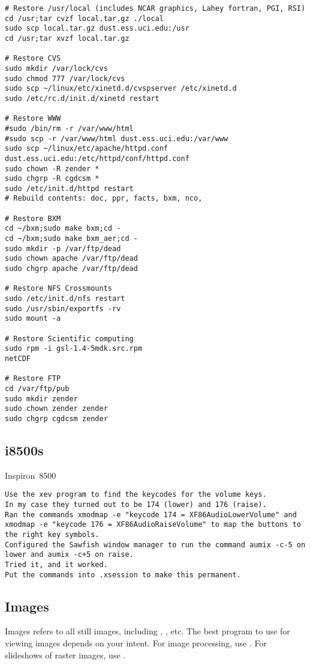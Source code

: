 \documentclass[12pt,twoside]{article}
\begin{document}
\begin{verbatim}
# Restore /usr/local (includes NCAR graphics, Lahey fortran, PGI, RSI)
cd /usr;tar cvzf local.tar.gz ./local
sudo scp local.tar.gz dust.ess.uci.edu:/usr
cd /usr;tar xvzf local.tar.gz

# Restore CVS
sudo mkdir /var/lock/cvs
sudo chmod 777 /var/lock/cvs
sudo scp ~/linux/etc/xinetd.d/cvspserver /etc/xinetd.d
sudo /etc/rc.d/init.d/xinetd restart

# Restore WWW
#sudo /bin/rm -r /var/www/html
#sudo scp -r /var/www/html dust.ess.uci.edu:/var/www
sudo scp ~/linux/etc/apache/httpd.conf dust.ess.uci.edu:/etc/httpd/conf/httpd.conf
sudo chown -R zender *
sudo chgrp -R cgdcsm *
sudo /etc/init.d/httpd restart
# Rebuild contents: doc, ppr, facts, bxm, nco, 

# Restore BXM
cd ~/bxm;sudo make bxm;cd -
cd ~/bxm;sudo make bxm_aer;cd -
sudo mkdir -p /var/ftp/dead
sudo chown apache /var/ftp/dead
sudo chgrp apache /var/ftp/dead

# Restore NFS Crossmounts
sudo /etc/init.d/nfs restart
sudo /usr/sbin/exportfs -rv
sudo mount -a

# Restore Scientific computing
sudo rpm -i gsl-1.4-5mdk.src.rpm
netCDF

# Restore FTP
cd /var/ftp/pub
sudo mkdir zender
sudo chown zender zender
sudo chgrp cgdcsm zender
\end{verbatim}

\subsection{i8500s}\label{sxn:i8500}
Inspiron~8500
\begin{verbatim}
Use the xev program to find the keycodes for the volume keys. 
In my case they turned out to be 174 (lower) and 176 (raise).  
Ran the commands xmodmap -e "keycode 174 = XF86AudioLowerVolume" and
xmodmap -e "keycode 176 = XF86AudioRaiseVolume" to map the buttons to
the right key symbols.  
Configured the Sawfish window manager to run the command aumix -c-5 on
lower and aumix -c+5 on raise.  
Tried it, and it worked. 
Put the commands into .xsession to make this permanent. 
\end{verbatim}

\subsection{Images}\label{sxn:img}
Images refers to all still images, including ,
, etc. 
The best program to use for viewing images depends on your intent.
For image processing, use .
For slideshows of raster images, use .
\end{document}
